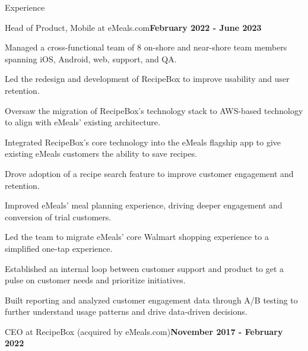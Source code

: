 \documentclass{resume} %
\begin{document}
\begin{rSection}{Experience}
\begin{rSubsection}{Head of Product, Mobile at eMeals.com}{\bf February 2022 - June 2023}{}{}
    \item Managed a cross-functional team of 8 on-shore and near-shore team members spanning iOS, Android, web, support, and QA.
    \item Led the redesign and development of RecipeBox to improve usability and user retention.
    \item Oversaw the migration of RecipeBox's technology stack to AWS-based technology to align with eMeals' existing architecture.
    \item Integrated RecipeBox's core technology into the eMeals flagship app to give existing eMeals customers the ability to save recipes.
    \item Drove adoption of a recipe search feature to improve customer engagement and retention.
    \item Improved eMeals' meal planning experience, driving deeper engagement and conversion of trial customers.
    \item Led the team to migrate eMeals' core Walmart shopping experience to a simplified one-tap experience.
    \item Established an internal loop between customer support and product to get a pulse on customer needs and prioritize initiatives.
    \item Built reporting and analyzed customer engagement data through A/B testing to further understand usage patterns and drive data-driven decisions.

    \end{rSubsection}


    \begin{rSubsection}{CEO at RecipeBox (acquired by eMeals.com)}{\bf November 2017 - February 2022}{}{}


\end{rSubsection}
\end{rSection}
\end{document}
